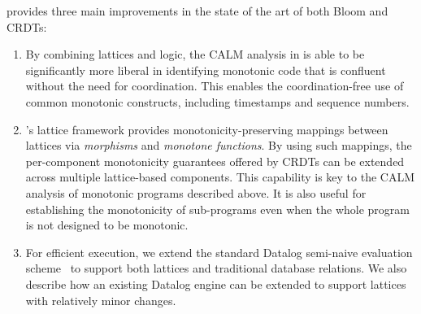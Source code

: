 
\lang provides three main improvements in the state of the art of both Bloom and CRDTs:  
\begin{enumerate}
\item By combining lattices and logic, the CALM analysis in \lang is able to be
  significantly more liberal in identifying monotonic code that is confluent
  without the need for coordination.  This enables the coordination-free use of
  common monotonic constructs, including timestamps and sequence numbers.

\item {\lang}'s lattice framework provides monotonicity-preserving mappings
  between lattices via \emph{morphisms} and \emph{monotone functions}.  By using
  such mappings, the per-component monotonicity guarantees offered by CRDTs can
  be extended across multiple lattice-based components.  This capability is key
  to the CALM analysis of monotonic \lang programs described above.  It is also
  useful for establishing the monotonicity of sub-programs even when the whole
  program is not designed to be monotonic.

\item For efficient execution, we extend the standard Datalog semi-naive
  evaluation scheme~\cite{Balbin1987} to support both lattices and traditional
  database relations. We also describe how an existing Datalog engine can be
  extended to support lattices with relatively minor changes.
\end{enumerate}

